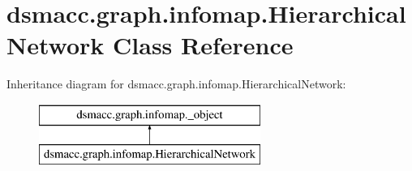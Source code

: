 \hypertarget{classdsmacc_1_1graph_1_1infomap_1_1HierarchicalNetwork}{}\section{dsmacc.\+graph.\+infomap.\+Hierarchical\+Network Class Reference}
\label{classdsmacc_1_1graph_1_1infomap_1_1HierarchicalNetwork}
Inheritance diagram for dsmacc.\+graph.\+infomap.\+Hierarchical\+Network\+:\begin{figure}[H]
\begin{center}
\leavevmode
\includegraphics[height=2.000000cm]{classdsmacc_1_1graph_1_1infomap_1_1HierarchicalNetwork}
\end{center}
\end{figure}
